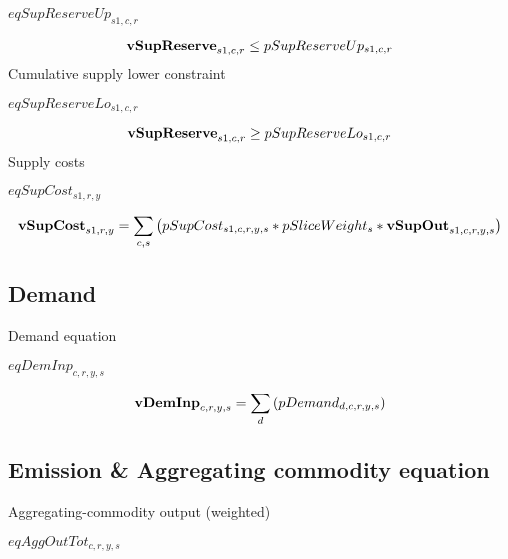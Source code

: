 \documentclass{article}
\begin{document}
$eqSupReserveUp_{s1,c,r}$





\begin{dmath}
{\bf vSupReserve}_{s1,c,r}  \le  pSupReserveUp_{s1,c,r}
\end{dmath}
Cumulative supply lower constraint







$eqSupReserveLo_{s1,c,r}$





\begin{dmath}
{\bf vSupReserve}_{s1,c,r}  \ge  pSupReserveLo_{s1,c,r}
\end{dmath}
Supply costs







$eqSupCost_{s1,r,y}$





\begin{dmath}
{\bf vSupCost}_{s1,r,y}  =  \sum_{c,s}{\left(pSupCost_{s1,c,r,y,s}*pSliceWeight_{s}*{\bf vSupOut}_{s1,c,r,y,s}\right)}
\end{dmath}
\subsection*{Demand}
Demand equation







$eqDemInp_{c,r,y,s}$





\begin{dmath}
{\bf vDemInp}_{c,r,y,s}  =  \sum_{d}{\left(pDemand_{d,c,r,y,s}\right)}
\end{dmath}
\subsection*{Emission \& Aggregating commodity equation}
Aggregating-commodity output (weighted)







$eqAggOutTot_{c,r,y,s}$
\end{document}
